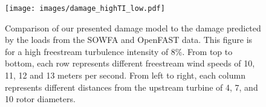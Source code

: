 \documentclass[11pt,letterpaper]{article}
\begin{document}
% 
\begin{figure}
    \centering
    \texttt{[image: images/damage\_highTI\_low.pdf]}
    \caption{Comparison of our presented damage model to the damage predicted by the loads from the SOWFA and OpenFAST data. This figure is for a high freestream turbulence intensity of 8\%. From top to bottom, each row represents different freestream wind speeds of 10, 11, 12 and 13 meters per second. From left to right, each column represents different distances from the upstream turbine of 4, 7, and 10 rotor diameters.}
    \label{high_TI}
\end{figure}

% 
% 
\end{document}
